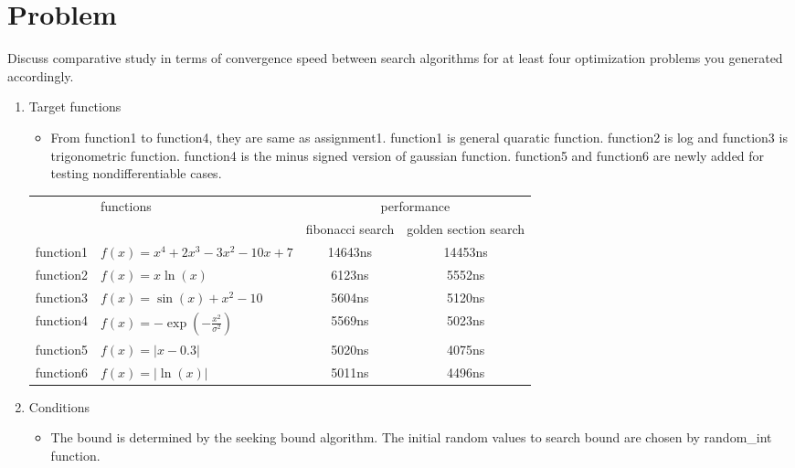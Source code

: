 \documentclass[12pt,letterpaper]{article}
\begin{document}
\section*{Problem}

Discuss comparative study in terms of convergence speed between search algorithms for at least four optimization problems you generated accordingly.

\begin{enumerate}
\item Target functions
\begin{itemize}
\item From function1 to function4, they are same as assignment1. 
function1 is general quaratic function. function2 is log and function3 is trigonometric function. 
function4 is the minus signed version of gaussian function. 
function5 and function6 are newly added for testing nondifferentiable cases.
\end{itemize}
\begin{center}
    \begin{tabular}{| c | l | c | c | } \hline
                  & \multirow{2}{*}{functions}            & \multicolumn{2}{c|}{performance} \\ \cline{3-4}
                  &                                       & fibonacci search & golden section search  \\ \hline
        function1 & $f(x)=x^4 +2x^3-3x^2-10x+7$           &  14643ns         & 14453ns   \\
        function2 & $f(x)=x\ln(x)$                        &  6123ns          & 5552ns    \\
        function3 & $f(x)=\sin(x)+x^2-10$                 &  5604ns          & 5120ns    \\
        function4 & $f(x)=-\exp(-\frac{x^2}{\sigma ^2})$  &  5569ns          & 5023ns    \\
        function5 & $f(x)=|x-0.3|$                        &  5020ns          & 4075ns    \\
        function6 & $f(x)=|\ln(x)|$                       &  5011ns          & 4496ns    \\
        \hline
    \end{tabular}
\end{center}

\item Conditions
\begin{itemize}
\item The bound is determined by the seeking bound algorithm. The initial random values to search bound are chosen by random\_int function.
\end{itemize}


\end{enumerate}
\end{document}
